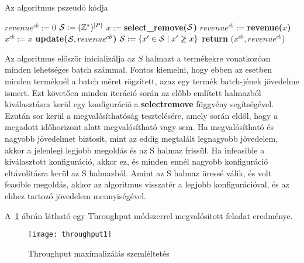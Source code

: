 \begin{algorithm}[H]
\caption{Az algoritmus pszeudó kódja}
\label{throughput}
\begin{algorithmic}[1]
  \State $revenue^{cb}:=  0$
  \State ${\cal S}:=  (\mathbb{Z}^*)^{|P|}$
    \State $x:= $\textbf{select\_remove(}$\cal S$\textbf{)}
        \State $revenue^{cb}:= $\textbf{revenue(}$x$\textbf{)}
        \State $x^{cb}:=  x$
        \State \textbf{update(}${\cal S},revenue^{cb}$\textbf{)}
      \EndIf
    \Else
      \State ${\cal S}:= \{ x'\in{\cal S} \mid x' \not\ge x\}$
    \EndIf
  \EndWhile
    \State \textbf{return} ($x^{cb},revenue^{cb}$)
  \EndIf
\end{algorithmic}
\end{algorithm}

Az algoritmus először inicializálja az $S$ halmazt a termékekre vonatkozóan minden lehetséges batch számmal.
Fontos kiemelni, hogy ebben az esetben minden terméknél a batch méret rögzített, azaz egy termék batch-jének jövedelme ismert.
Ezt követően minden iteráció során az előbb említett halmazból kiválasztásra kerül egy konfiguráció a \textbf{select\textunderscore remove} függvény segítségével.
Ezután sor kerül a megvalósíthatóság tesztelésére, amely során eldől, hogy a megadott időhorizont alatt megvalósítható vagy sem.
Ha megvalósítható és nagyobb jövedelmet biztosít, mint az eddig megtalált legnagyobb jövedelem, akkor a jelenlegi legjobb megoldás és az S halmaz frissül.
Ha infeasible a kiválasztott konfiguráció, akkor ez, és minden ennél nagyobb konfiguráció eltávolításra kerül az S halmazból.
Amint az S halmaz üressé válik, és volt feasible megoldás, akkor az algoritmus visszatér a legjobb konfigurációval, és az ehhez tartozó jövedelem mennyiségével.

A~\ref{throughput1} ábrán látható egy Throughput módszerrel megvalósított feladat eredménye.
\begin{figure}[H]
\begin{center}
\texttt{[image: throughput1]}
\caption{Throughput maximalizálás szemléltetés}
\label{throughput1}
\end{center}
\end{figure}

